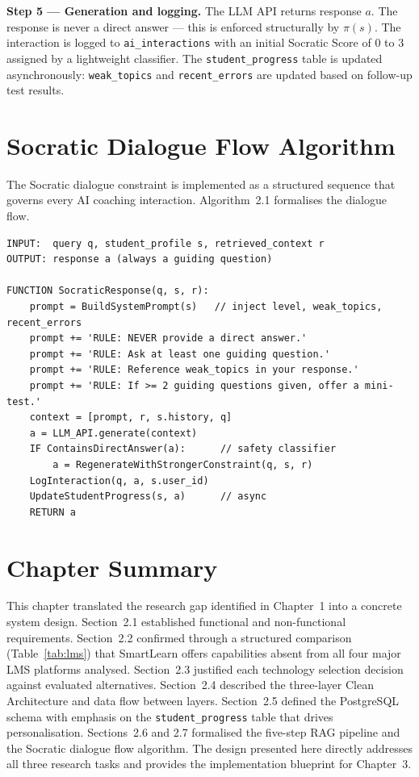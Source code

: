 \documentclass[12pt,a4paper]{report}
\begin{document}
\noindent\textbf{Step 5 --- Generation and logging.} The LLM API returns response $a$. The
response is never a direct answer --- this is enforced structurally by $\pi(s)$. The
interaction is logged to \texttt{ai\_interactions} with an initial Socratic Score of 0 to
3 assigned by a lightweight classifier. The \texttt{student\_progress} table is updated
asynchronously: \texttt{weak\_topics} and \texttt{recent\_errors} are updated based on
follow-up test results.

\section{Socratic Dialogue Flow Algorithm}

The Socratic dialogue constraint is implemented as a structured sequence that governs
every AI coaching interaction. Algorithm~2.1 formalises the dialogue flow.

\begin{lstlisting}[caption={Socratic Dialogue Flow Algorithm},label=lst:algo]
INPUT:  query q, student_profile s, retrieved_context r
OUTPUT: response a (always a guiding question)

FUNCTION SocraticResponse(q, s, r):
    prompt = BuildSystemPrompt(s)   // inject level, weak_topics, recent_errors
    prompt += 'RULE: NEVER provide a direct answer.'
    prompt += 'RULE: Ask at least one guiding question.'
    prompt += 'RULE: Reference weak_topics in your response.'
    prompt += 'RULE: If >= 2 guiding questions given, offer a mini-test.'
    context = [prompt, r, s.history, q]
    a = LLM_API.generate(context)
    IF ContainsDirectAnswer(a):      // safety classifier
        a = RegenerateWithStrongerConstraint(q, s, r)
    LogInteraction(q, a, s.user_id)
    UpdateStudentProgress(s, a)      // async
    RETURN a
\end{lstlisting}

\section{Chapter Summary}

This chapter translated the research gap identified in Chapter~1 into a concrete system
design. Section~2.1 established functional and non-functional requirements. Section~2.2
confirmed through a structured comparison (Table~\ref{tab:lms}) that SmartLearn offers
capabilities absent from all four major LMS platforms analysed. Section~2.3 justified each
technology selection decision against evaluated alternatives. Section~2.4 described the
three-layer Clean Architecture and data flow between layers. Section~2.5 defined the
PostgreSQL schema with emphasis on the \texttt{student\_progress} table that drives
personalisation. Sections~2.6 and 2.7 formalised the five-step RAG pipeline and the
Socratic dialogue flow algorithm. The design presented here directly addresses all three
research tasks and provides the implementation blueprint for Chapter~3.
\end{document}

